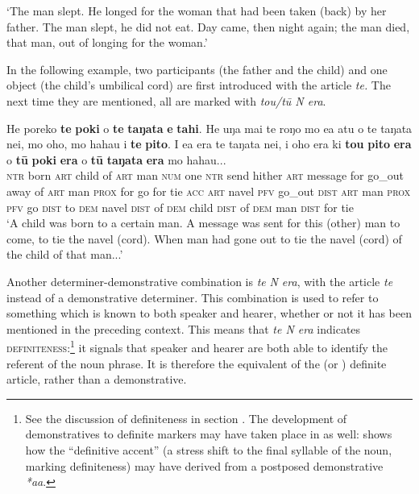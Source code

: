 \glt
‘The man slept. He longed for the woman that had been taken (back) by her father. The man slept, he did not eat. Day came, then night again; the man died, that man, out of longing for the woman.’ \textstyleExampleref{[Mtx-5-02.057-060]}
\z

In the following example, two participants (the father and the child) and one object (the child’s umbilical cord) are first introduced with the article \textit{te.} The next time they are mentioned, all are marked with \textit{tou/tū N era}.

\ea\label{ex:4.200}
\gll He poreko \textbf{te} \textbf{poki} o \textbf{te} \textbf{taŋata} \textbf{e} \textbf{tahi}. He uŋa mai te roŋo mo e{\ꞌ}a atu o te taŋata nei, mo oho, mo haha{\ꞌ}u i \textbf{te} \textbf{pito}. I e{\ꞌ}a era te taŋata nei, i oho era ki \textbf{tou} \textbf{pito} \textbf{era} o \textbf{tū} \textbf{poki} \textbf{era}  o \textbf{tū} \textbf{taŋata} \textbf{era} mo haha{\ꞌ}u...\\
\textsc{ntr} born \textsc{art} child of \textsc{art} man \textsc{num} one \textsc{ntr} send hither \textsc{art} message for go\_out away of \textsc{art} man \textsc{prox} for go for tie \textsc{acc} \textsc{art} navel \textsc{pfv} go\_out \textsc{dist} \textsc{art} man \textsc{prox} \textsc{pfv} go \textsc{dist} to \textsc{dem} navel \textsc{dist} of \textsc{dem} child \textsc{dist}  of \textsc{dem} man \textsc{dist} for tie\\

\glt 
‘A child was born to a certain man. A message was sent for this (other) man to come, to tie the navel (cord). When man had gone out to tie the navel (cord){\rmfnm} of the child of that man...’ \textstyleExampleref{[Blx-2-1.001-005]}
\z
{}

Another determiner-demonstrative combination is \textit{te} \textit{N era}, with the article \textit{te} instead of a demonstrative determiner. This combination is used to refer to something which is known to both speaker and hearer, whether or not it has been mentioned in the preceding context. This means that \textit{te N era} indicates \textsc{definiteness}:\footnote{\label{fn:219}See the discussion of definiteness in section . The development of demonstratives to definite markers may have taken place in  as well: \citet{Clark1974} shows how the “definitive accent” (a stress shift to the final syllable of the noun, marking definiteness) may have derived from a postposed demonstrative \textit{*aa}.} it signals that speaker and hearer are both able to identify the referent of the noun phrase. It is therefore the equivalent of the  (or ) definite article, rather than a demonstrative. 

